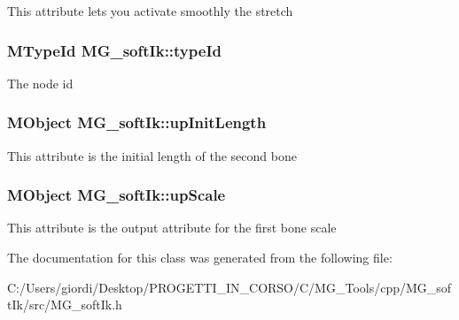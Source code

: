 This attribute lets you activate smoothly the stretch \hypertarget{class_m_g__soft_ik_aa83471e41222b306261d20f6851548b8}{
\subsubsection[{type\-Id}]{\setlength{\rightskip}{0pt plus 5cm}M\-Type\-Id M\-G\-\_\-soft\-Ik\-::type\-Id\hspace{0.3cm}{\ttfamily [static]}}}\label{class_m_g__soft_ik_aa83471e41222b306261d20f6851548b8}
The node id \hypertarget{class_m_g__soft_ik_a77928e84cd0a9004779b0c180082efe9}{
\subsubsection[{up\-Init\-Length}]{\setlength{\rightskip}{0pt plus 5cm}M\-Object M\-G\-\_\-soft\-Ik\-::up\-Init\-Length\hspace{0.3cm}{\ttfamily [static]}}}\label{class_m_g__soft_ik_a77928e84cd0a9004779b0c180082efe9}
This attribute is the initial length of the second bone \hypertarget{class_m_g__soft_ik_a756bb616c77c3f8e43ede9b9e6cb5640}{
\subsubsection[{up\-Scale}]{\setlength{\rightskip}{0pt plus 5cm}M\-Object M\-G\-\_\-soft\-Ik\-::up\-Scale\hspace{0.3cm}{\ttfamily [static]}}}\label{class_m_g__soft_ik_a756bb616c77c3f8e43ede9b9e6cb5640}
This attribute is the output attribute for the first bone scale 

The documentation for this class was generated from the following file\-:\begin{DoxyCompactItemize}
\item 
C\-:/\-Users/giordi/\-Desktop/\-P\-R\-O\-G\-E\-T\-T\-I\-\_\-\-I\-N\-\_\-\-C\-O\-R\-S\-O/\-C/\-M\-G\-\_\-\-Tools/cpp/\-M\-G\-\_\-soft\-Ik/src/M\-G\-\_\-soft\-Ik.\-h\end{DoxyCompactItemize}
